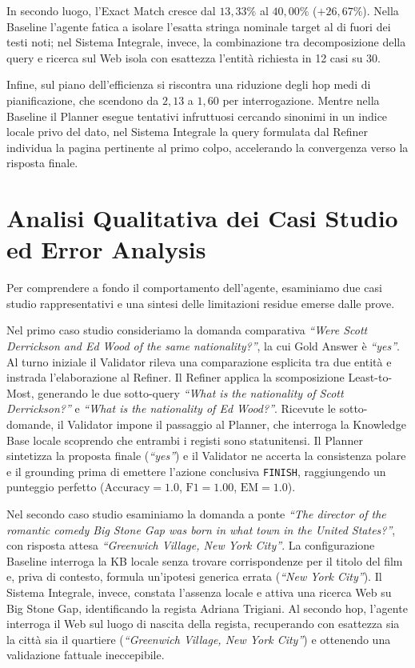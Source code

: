 In secondo luogo, l'Exact Match cresce dal $13,33\%$ al $40,00\%$ ($+26,67\%$). Nella Baseline l'agente fatica a isolare l'esatta stringa nominale target al di fuori dei testi noti; nel Sistema Integrale, invece, la combinazione tra decomposizione della query e ricerca sul Web isola con esattezza l'entità richiesta in 12 casi su 30.

Infine, sul piano dell'efficienza si riscontra una riduzione degli hop medi di pianificazione, che scendono da $2,13$ a $1,60$ per interrogazione. Mentre nella Baseline il Planner esegue tentativi infruttuosi cercando sinonimi in un indice locale privo del dato, nel Sistema Integrale la query formulata dal Refiner individua la pagina pertinente al primo colpo, accelerando la convergenza verso la risposta finale.

\section{Analisi Qualitativa dei Casi Studio ed Error Analysis}
\label{sec:analisi_qualitativa}

Per comprendere a fondo il comportamento dell'agente, esaminiamo due casi studio rappresentativi e una sintesi delle limitazioni residue emerse dalle prove.

Nel primo caso studio consideriamo la domanda comparativa \textit{``Were Scott Derrickson and Ed Wood of the same nationality?''}, la cui Gold Answer è \textit{``yes''}. Al turno iniziale il Validator rileva una comparazione esplicita tra due entità e instrada l'elaborazione al Refiner. Il Refiner applica la scomposizione Least-to-Most, generando le due sotto-query \textit{``What is the nationality of Scott Derrickson?''} e \textit{``What is the nationality of Ed Wood?''}. Ricevute le sotto-domande, il Validator impone il passaggio al Planner, che interroga la Knowledge Base locale scoprendo che entrambi i registi sono statunitensi. Il Planner sintetizza la proposta finale (\textit{``yes''}) e il Validator ne accerta la consistenza polare e il grounding prima di emettere l'azione conclusiva \texttt{FINISH}, raggiungendo un punteggio perfetto ($\text{Accuracy} = 1.0$, $\text{F1} = 1.00$, $\text{EM} = 1.0$).

Nel secondo caso studio esaminiamo la domanda a ponte \textit{``The director of the romantic comedy Big Stone Gap was born in what town in the United States?''}, con risposta attesa \textit{``Greenwich Village, New York City''}. La configurazione Baseline interroga la KB locale senza trovare corrispondenze per il titolo del film e, priva di contesto, formula un'ipotesi generica errata (\textit{``New York City''}). Il Sistema Integrale, invece, constata l'assenza locale e attiva una ricerca Web su Big Stone Gap, identificando la regista Adriana Trigiani. Al secondo hop, l'agente interroga il Web sul luogo di nascita della regista, recuperando con esattezza sia la città sia il quartiere (\textit{``Greenwich Village, New York City''}) e ottenendo una validazione fattuale ineccepibile.

